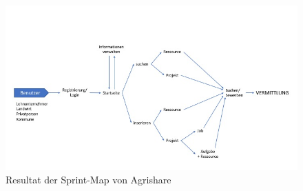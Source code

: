 \begin{figure}[h!]
	\includegraphics[width=\textwidth]{99_IMG/03_Umsetzung/map.jpg}
	\caption{Resultat der Sprint-Map von Agrishare}
	\label{fig:map}
\end{figure}
%

